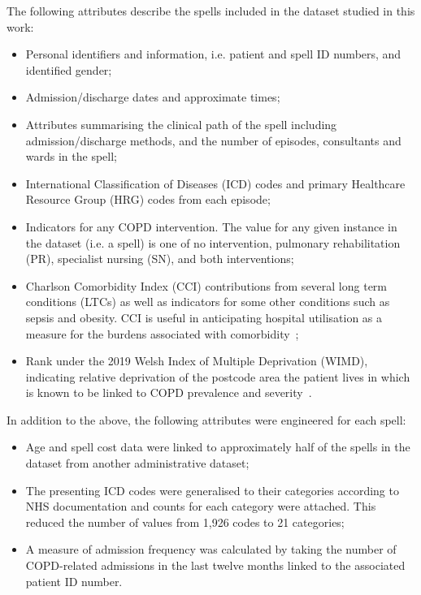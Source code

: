 \documentclass[]{interact}
\theoremstyle{plain}%
\theoremstyle{definition}
\theoremstyle{remark}
\begin{document}
The following attributes describe the spells included in the dataset studied in
this work:

\begin{itemize}
    \item Personal identifiers and information, i.e. patient and spell ID
        numbers, and identified gender;
    \item Admission/discharge dates and approximate times;
    \item Attributes summarising the clinical path of the spell including
        admission/discharge methods, and the number of episodes, consultants and
        wards in the spell;
    \item International Classification of Diseases (ICD) codes and primary
        Healthcare Resource Group (HRG) codes from each episode;
    \item Indicators for any COPD intervention. The value for any given instance
        in the dataset (i.e. a spell) is one of no intervention, pulmonary
        rehabilitation (PR), specialist nursing (SN), and both interventions;
    \item Charlson Comorbidity Index (CCI) contributions from several long term
        conditions (LTCs) as well as indicators for some other conditions such
        as sepsis and obesity. CCI is useful in anticipating hospital
        utilisation as a measure for the burdens associated with
        comorbidity~\cite{Simon2011};
    \item Rank under the 2019 Welsh Index of Multiple Deprivation (WIMD),
        indicating relative deprivation of the postcode area the patient lives
        in which is known to be linked to COPD prevalence and
        severity~\cite{Collins2018,Sexton2016,Steiner2017}.
\end{itemize}

In addition to the above, the following attributes were engineered for each
spell:

\begin{itemize}
    \item Age and spell cost data were linked to approximately half of the
        spells in the dataset from another administrative dataset;
    \item The presenting ICD codes were generalised to their categories
        according to NHS documentation and counts for each category were
        attached. This reduced the number of values from
        1,926 codes to 21 categories;
    \item A measure of admission frequency was calculated by taking the number
        of COPD-related admissions in the last twelve months linked to the
        associated patient ID number.
\end{itemize}
\end{document}
